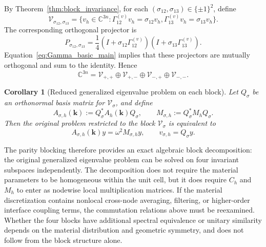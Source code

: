 \documentclass[11pt,oneside]{article}
\numberwithin{equation}{section}
\theoremstyle{plain}
\newtheorem{corollary}[theorem]{Corollary}
\theoremstyle{remark}
\newcommand{\bk}{\bm{k}}
\begin{document}
By Theorem~\ref{thm:block_invariance}, for each \((\sigma_{12},\sigma_{13})\in\{\pm1\}^2\), define
\begin{equation}\label{eq:V_sigma_main}
\mathcal V_{\sigma_{12},\sigma_{13}}
=
\{v_h\in\mathbb C^{3n}:
\Gamma_{12}^{(v)}v_h=\sigma_{12}v_h,
\Gamma_{13}^{(v)}v_h=\sigma_{13}v_h\}.
\end{equation}
The corresponding orthogonal projector is
\begin{equation}\label{eq:Proj_sigma_main}
P_{\sigma_{12},\sigma_{13}}
=\frac14
(I+\sigma_{12}\Gamma_{12}^{(v)})
(I+\sigma_{13}\Gamma_{13}^{(v)}).
\end{equation}
Equation~\eqref{eq:Gamma_basic_main} implies that these projectors are mutually orthogonal and sum to the identity. Hence
\begin{equation}\label{eq:direct_sum_block_main}
\mathbb C^{3n}
=
\mathcal V_{+,+}\oplus
\mathcal V_{+,-}\oplus
\mathcal V_{-,+}\oplus
\mathcal V_{-,-}.
\end{equation}

\begin{corollary}[Reduced generalized eigenvalue problem on each block]\label{cor:block_reduced_gep}
Let \(Q_\sigma\) be an orthonormal basis matrix for \(\mathcal V_\sigma\), and define
\begin{equation}\label{eq:Asigma_main}
A_{\sigma,h}(\bk):=Q_\sigma^*A_h(\bk)Q_\sigma,
\qquad
M_{\sigma,h}:=Q_\sigma^*M_hQ_\sigma.
\end{equation}
Then the original problem restricted to the block \(\mathcal V_\sigma\) is equivalent to
\begin{equation}\label{eq:reduced_eig_main}
A_{\sigma,h}(\bk)y=\omega^2M_{\sigma,h}y,
\qquad v_{\sigma,h}=Q_\sigma y.
\end{equation}
\end{corollary}
The parity blocking therefore provides an exact algebraic block decomposition: the original generalized eigenvalue problem can be solved on four invariant subspaces independently. The decomposition does not require the material parameters to be homogeneous within the unit cell, but it does require \(C_h\) and \(M_h\) to enter as nodewise local multiplication matrices. If the material discretization contains nonlocal cross-node averaging, filtering, or higher-order interface coupling terms, the commutation relations above must be reexamined. Whether the four blocks have additional spectral equivalence or unitary similarity depends on the material distribution and geometric symmetry, and does not follow from the block structure alone.
\end{document}
